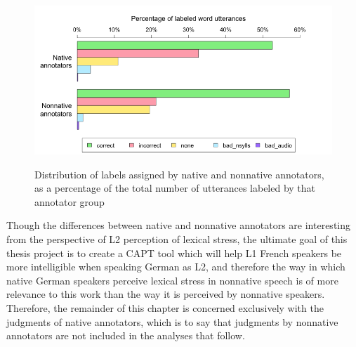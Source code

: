 		
			\begin{figure}[tb]
				\centering
				\caption[Distribution of labels by annotator L1]{Distribution of labels assigned by native and nonnative annotators,
				as a percentage of the total number of utterances labeled by that annotator group %
				}
				\includegraphics[width=\textwidth]{img/plots/pctJudgmentsByL1-notStacked}
				\label{fig:agreement:l1bars}
			\end{figure}
			
	
			
		Though the differences between native and nonnative annotators are interesting from the perspective of L2 perception of lexical stress, the ultimate goal of this thesis project is to create a CAPT tool which will help L1 French speakers be more intelligible when speaking German as L2, and therefore the way in which native German speakers perceive lexical stress in nonnative speech is of more relevance to this work than the way it is perceived by nonnative speakers. Therefore, the remainder of this chapter is concerned exclusively with the judgments of native annotators, which is to say that judgments by nonnative annotators are not included in the analyses that follow.
			
